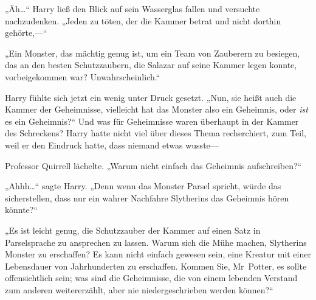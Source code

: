 „Äh…“ Harry ließ den Blick auf sein Wasserglas fallen und versuchte nachzudenken. „Jeden zu töten, der die Kammer betrat und nicht dorthin gehörte,—“

„Ein Monster, das mächtig genug ist, um ein Team von Zauberern zu besiegen, das an den besten Schutzzaubern, die Salazar auf seine Kammer legen konnte, vorbeigekommen war? Unwahrscheinlich.“

Harry fühlte sich jetzt ein wenig unter Druck gesetzt. „Nun, sie heißt auch die Kammer der Geheimnisse, vielleicht hat das Monster also ein Geheimnis, oder \emph{ist} es ein Geheimnis?“ Und was für Geheimnisse waren überhaupt in der Kammer des Schreckens? Harry hatte nicht viel über dieses Thema recherchiert, zum Teil, weil er den Eindruck hatte, dass niemand etwas wusste—

Professor Quirrell lächelte. „Warum nicht einfach das Geheimnis aufschreiben?“

„Ahhh…“ sagte Harry. „Denn wenn das Monster Parsel spricht, würde das sicherstellen, dass nur ein wahrer Nachfahre Slytherins das Geheimnis hören könnte?“

„Es ist leicht genug, die Schutzzauber der Kammer auf einen Satz in Parselsprache zu ansprechen zu lassen. Warum sich die Mühe machen, Slytherins Monster zu erschaffen? Es kann nicht einfach gewesen sein, eine Kreatur mit einer Lebensdauer von Jahrhunderten zu erschaffen. Kommen Sie, Mr~Potter, es sollte offensichtlich sein; was sind die Geheimnisse, die von einem lebenden Verstand zum anderen weitererzählt, aber nie niedergeschrieben werden können?“

